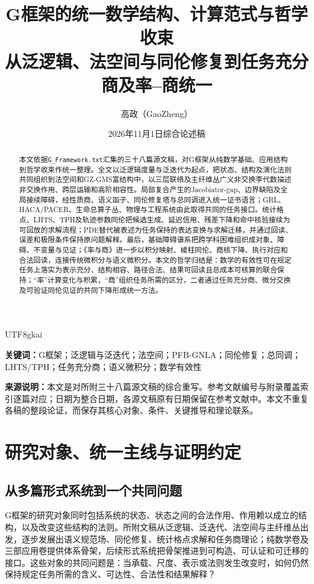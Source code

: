 \documentclass[11pt,a4paper]{article}
\title{\bfseries G框架的统一数学结构、计算范式与哲学收束\\[0.65em]\large 从泛逻辑、法空间与同伦修复到任务充分商及率--商统一}
\author{高政（GaoZheng）}
\date{2026年11月1日\quad 综合论述稿}
\theoremstyle{plain}
\theoremstyle{definition}
\theoremstyle{remark}
\begin{document}
\begin{CJK*}{UTF8}{gkai}
\maketitle
\thispagestyle{empty}
\begin{abstract}
本文依据\texttt{G\_Framework.txt}汇集的三十八篇源文稿，对G框架从纯数学基础、应用结构到哲学收束作统一整理。全文以泛逻辑度量与泛迭代为起点，把状态、结构及演化法则共同组织到法空间和GZ-GMS富结构中，以三层联络及主纤维丛广义非交换李代数描述非交换作用、跨层运输和高阶相容性。局部复合产生的Jacobiator-gap、边界缺陷及全局接续障碍，经性质商、语义函子、同伦修复塔与总同调进入统一证书语言；GRL、HACA/PACER、生命总算子丛、物理与工程系统由此取得共同的任务接口。统计格点、LHTS、TPH及轨迹参数同伦把候选生成、延迟信用、残差下降和命中核验接续为可回放的求解流程；PDE替代被表述为任务保持的表达变换与求解迁移，并通过回读、误差和极限条件保持原问题解释。最后，基础障碍谱系把跨学科困难组织成对象、障碍、不变量与见证；《率与商》进一步以积分映射、棱柱同伦、商核下降、执行对应和合法回读，连接传统微积分与语义微积分。本文的哲学归结是：数学的有效性可在规定任务上落实为表示充分、结构相容、路径合法、结果可回读且总成本可核算的联合保持；“率”计算变化与积累，“商”组织任务所需的区分，二者通过任务充分商、微分交换及可验证同伦见证的共同下降形成统一方法。
\end{abstract}
\noindent\textbf{关键词：}G框架；泛逻辑与泛迭代；法空间；PFB-GNLA；同伦修复；总同调；LHTS/TPH；任务充分商；语义微积分；数学有效性
\par\vspace{0.8em}
\noindent\textbf{来源说明：}本文是对所附三十八篇源文稿的综合重写。参考文献编号与附录覆盖索引逐篇对应；日期为整合日期，各源文稿原有日期保留在参考文献中。本文不重复各稿的整段论证，而保存其核心对象、条件、关键推导和理论联系。
\clearpage
\setcounter{tocdepth}{2}
\tableofcontents
\clearpage


\section{研究对象、统一主线与证明约定}
\label{sec:introduction}

\subsection{从多篇形式系统到一个共同问题}
G框架的研究对象同时包括系统的状态、状态之间的合法作用、作用赖以成立的结构，以及改变这些结构的法则。所附文稿从泛逻辑、泛迭代、法空间与主纤维丛出发，逐步发展出语义规范场、同伦修复、统计格点求解和任务商理论；纯数学卷及三部应用卷提供体系骨架，后续形式系统把骨架推进到可构造、可认证和可迁移的接口\cite{S01,S02,S03,S04,S37,S38}。这些对象的共同问题是：当承载、尺度、表示或法则发生改变时，如何仍然保持规定任务所需的含义、可达性、合法性和结果解释？


\end{CJK*}
\end{document}
